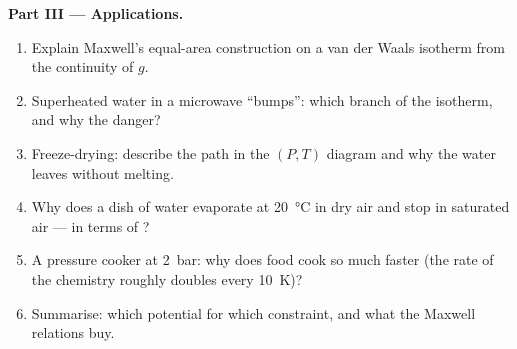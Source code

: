 \begin{problem}
\textbf{Part III --- Applications.}
\begin{enumerate}[resume]
  \item Explain Maxwell's equal-area construction on a van der Waals
        isotherm from the continuity of $g$.
  \item Superheated water in a microwave ``bumps'': which branch of the
        isotherm, and why the danger?
  \item Freeze-drying: describe the path in the $(P,T)$ diagram and
        why the water leaves without melting.
  \item Why does a dish of water evaporate at \qty{20}{\celsius} in dry air
        and stop in saturated air --- in terms of ?
  \item A pressure cooker at \qty{2}{bar}: why does food cook so much
        faster (the rate of the chemistry roughly doubles every
        \qty{10}{K})?
  \item Summarise: which potential for which constraint, and what the
        Maxwell relations buy.
\end{enumerate}
\end{problem}
